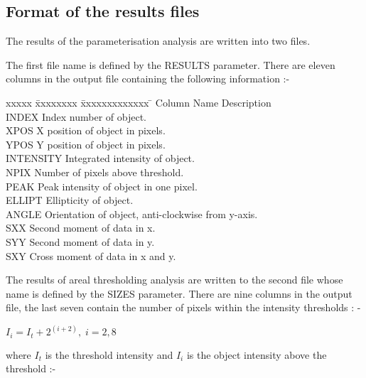 \subsection{Format of the results files}
The results of the parameterisation analysis are written into two
files. 

The first file name is defined by the RESULTS parameter. There are
eleven columns in the output file containing the following information
:-

\begin{center}
\begin{tabbing}
xxxxx \= xxxxxxxx \= xxxxxxxxxxxxx \= \kill
\> Column \> Name  \> Description \\
 \> INDEX \> Index number of object.\\
 \> XPOS \> X position of object in pixels.\\
 \> YPOS \> Y position of object in pixels.\\
 \> INTENSITY \> Integrated intensity of object.\\
 \> NPIX \> Number of pixels above threshold.\\
 \> PEAK \> Peak intensity of object in one pixel.\\
 \> ELLIPT \> Ellipticity of object.\\
 \> ANGLE \> Orientation of object, anti-clockwise from y-axis.\\
 \> SXX \> Second moment of data in x.\\
 \> SYY \> Second moment of data in y.\\
 \> SXY \> Cross moment of data in x and y.\\
\end{tabbing}
\end{center}

The results of areal thresholding analysis are written to the second
file whose  name is defined by the SIZES parameter.  There are nine
columns in the output file, the last seven contain the number of pixels
within the intensity thresholds : -
\begin{center}
\begin{math}
     I_{i} = I_{t} + 2^{(i+2)},\; i=2,8
\end{math}
\end{center}
where $I_{t}$ is the threshold intensity and $I_{i}$ is the object
intensity above the threshold :-

